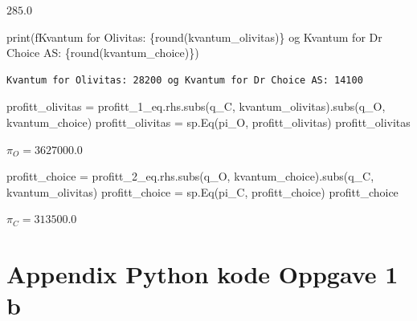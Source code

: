 \documentclass[
  12pt,
  a4paper,
  DIV=11,
  numbers=noendperiod]{scrartcl}
\newenvironment{Shaded}{\begin{snugshade}}{\end{snugshade}}
\newcommand{\BuiltInTok}[1]{\textcolor[rgb]{0.00,0.23,0.31}{#1}}
\newcommand{\NormalTok}[1]{\textcolor[rgb]{0.00,0.23,0.31}{#1}}
\newcommand{\OperatorTok}[1]{\textcolor[rgb]{0.37,0.37,0.37}{#1}}
\newcommand{\SpecialCharTok}[1]{\textcolor[rgb]{0.37,0.37,0.37}{#1}}
\newcommand{\SpecialStringTok}[1]{\textcolor[rgb]{0.13,0.47,0.30}{#1}}
\begin{document}
$\displaystyle 285.0$

\begin{Shaded}
\begin{Highlighting}[]
\BuiltInTok{print}\NormalTok{(}\SpecialStringTok{f\textquotesingle{}\textquotesingle{}\textquotesingle{}Kvantum for Olivitas: }\SpecialCharTok{\{}\BuiltInTok{round}\NormalTok{(kvantum\_olivitas)}\SpecialCharTok{\}}\SpecialStringTok{ og Kvantum for Dr Choice AS: }\SpecialCharTok{\{}\BuiltInTok{round}\NormalTok{(kvantum\_choice)}\SpecialCharTok{\}}\SpecialStringTok{\textquotesingle{}\textquotesingle{}\textquotesingle{}}\NormalTok{)}
\end{Highlighting}
\end{Shaded}

\begin{verbatim}
Kvantum for Olivitas: 28200 og Kvantum for Dr Choice AS: 14100
\end{verbatim}

\begin{Shaded}
\begin{Highlighting}[]
\NormalTok{profitt\_olivitas }\OperatorTok{=}\NormalTok{ profitt\_1\_eq.rhs.subs(q\_C, kvantum\_olivitas).subs(q\_O, kvantum\_choice)}
\NormalTok{profitt\_olivitas }\OperatorTok{=}\NormalTok{ sp.Eq(pi\_O, profitt\_olivitas)}
\NormalTok{profitt\_olivitas}
\end{Highlighting}
\end{Shaded}

$\displaystyle π_{O} = 3627000.0$

\begin{Shaded}
\begin{Highlighting}[]
\NormalTok{profitt\_choice }\OperatorTok{=}\NormalTok{ profitt\_2\_eq.rhs.subs(q\_O, kvantum\_choice).subs(q\_C, kvantum\_olivitas)}
\NormalTok{profitt\_choice }\OperatorTok{=}\NormalTok{ sp.Eq(pi\_C, profitt\_choice)}
\NormalTok{profitt\_choice}
\end{Highlighting}
\end{Shaded}

$\displaystyle π_{C} = 313500.0$

\clearpage

\section {Appendix Python kode Oppgave 1 b}
\end{document}
